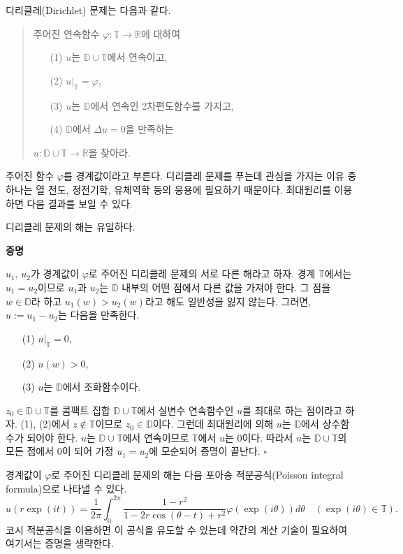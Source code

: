 디리클레(Dirichlet) 문제는 다음과 같다.
\begin{quote}
주어진 연속함수 $\varphi: \mathbb T \to \mathbb R$에 대하여
\begin{itemize}
\item[(1)] $u$는 $\mathbb D \cup \mathbb T$에서 연속이고,
\item[(2)] $u|_{\mathbb T}=\varphi$,
\item[(3)] $u$는 $\mathbb D$에서 연속인 $2$차편도함수를 가지고,
\item[(4)] $\mathbb D$에서 $\Delta u  = 0$을 만족하는
\end{itemize}
$u: \mathbb D \cup \mathbb T \to \mathbb R$을 찾아라.
\end{quote}

주어진 함수 $\varphi$를 경계값이라고 부른다.
디리클레 문제를 푸는데 관심을 가지는 이유 중 하나는
열 전도, 정전기학, 유체역학 등의 응용에 필요하기 때문이다.
최대원리를 이용하면 다음 결과를 보일 수 있다.

\begin{salt_prop}\label{prpo-5-1}
디리클레 문제의 해는 유일하다.
\end{salt_prop}

{\bf 증명}

$u_1$, $u_2$가 경계값이 $\varphi$로 주어진 디리클레 문제의 
서로 다른 해라고 하자. 경계 $\mathbb T$에서는 $u_1 = u_2$이므로
$u_1$과 $u_2$는 $\mathbb D$ 내부의 어떤 점에서 다른 값을 가져야 한다.
그 점을 $w\in\mathbb D$라 하고 $u_1(w) > u_2(w)$라고 해도 일반성을 잃지 않는다.
그러면, $u:=u_1 - u_2$는 다음을 만족한다.
\begin{itemize}
\item[(1)] $u|_{\mathbb T}=0$,
\item[(2)] $u(w)>0$,
\item[(3)] $u$는 $\mathbb D$에서 조화함수이다.
\end{itemize}
$z_0\in \mathbb D\cup \mathbb T$를
콤팩트 집합 $ \mathbb D\cup \mathbb T$에서
실변수 연속함수인 $u$를 최대로 하는 점이라고 하자.
(1), (2)에서 $z\not\in \mathbb T$이므로
$z_0\in \mathbb D$이다.
그런데 최대원리에 의해 $u$는 $\mathbb D$에서 상수함수가 되어야 한다.
$u$는  $ \mathbb D\cup \mathbb T$에서 연속이므로
$\mathbb T$에서 $u$는 $0$이다.
따라서 $u$는  $ \mathbb D\cup \mathbb T$의 모든 점에서 $0$이 되어
가정 $u_1 = u_2$에 모순되어 증명이 끝난다.
\hfill  $\square$

\begin{salt_remark}\label{rem-5-1}
경계값이 $\varphi$로 주어진 디리클레 문제의 해는 
다음 포아송 적분공식(Poisson integral formula)으로 나타낼 수 있다.
\[
u(r\exp(it)) = \dfrac1{2\pi} \int_0^{2\pi} 
\dfrac{1-r^2}{1-2r\cos(\theta -t) + r^2} \varphi(\exp(i\theta))d\theta
\quad (\exp(i\theta) \in \mathbb T).
\]
코시 적분공식을 이용하면 이 공식을 유도할 수 있는데
약간의 계산 기술이 필요하여 여기서는 증명을 생략한다.
\end{salt_remark}

